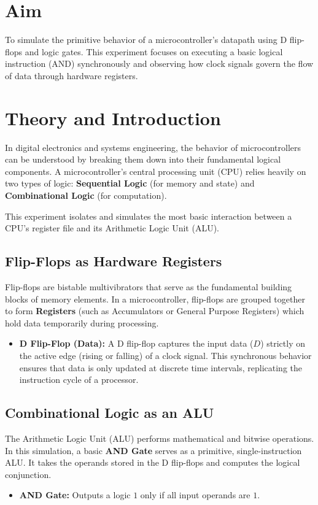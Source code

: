 \documentclass[11pt, a4paper]{article}
\begin{document}
\vspace{3em}

\setcounter{section}{0}

\section{Aim}
To simulate the primitive behavior of a microcontroller's datapath using D flip-flops and logic gates. This experiment focuses on executing a basic logical instruction (AND) synchronously and observing how clock signals govern the flow of data through hardware registers.

\section{Theory and Introduction}
In digital electronics and systems engineering, the behavior of microcontrollers can be understood by breaking them down into their fundamental logical components. A microcontroller's central processing unit (CPU) relies heavily on two types of logic: \textbf{Sequential Logic} (for memory and state) and \textbf{Combinational Logic} (for computation). 

This experiment isolates and simulates the most basic interaction between a CPU's register file and its Arithmetic Logic Unit (ALU).

\subsection{Flip-Flops as Hardware Registers}
Flip-flops are bistable multivibrators that serve as the fundamental building blocks of memory elements. In a microcontroller, flip-flops are grouped together to form \textbf{Registers} (such as Accumulators or General Purpose Registers) which hold data temporarily during processing.
\begin{itemize}
    \item \textbf{D Flip-Flop (Data):} A D flip-flop captures the input data ($D$) strictly on the active edge (rising or falling) of a clock signal. This synchronous behavior ensures that data is only updated at discrete time intervals, replicating the instruction cycle of a processor.
\end{itemize}

\subsection{Combinational Logic as an ALU}
The Arithmetic Logic Unit (ALU) performs mathematical and bitwise operations. In this simulation, a basic \textbf{AND Gate} serves as a primitive, single-instruction ALU. It takes the operands stored in the D flip-flops and computes the logical conjunction.
\begin{itemize}
    \item \textbf{AND Gate:} Outputs a logic $1$ only if all input operands are $1$.
\end{itemize}
\end{document}

